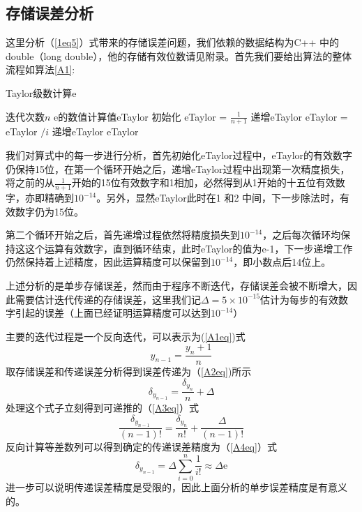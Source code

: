 \documentclass[onecolumn,compsoc]{IEEEtran}
\renewcommand{\|}{\Bigg |}
\newcommand{\e}{\mathrm{e}}
\begin{document}
\subsection{存储误差分析}
这里分析（\ref{1eq5}）式带来的存储误差问题，我们依赖的数据结构为C++ 中的double（long double），他的存储有效位数请见附录。首先我们要给出算法的整体流程如算法\ref{A1}:
\begin{algorithm}[h]\caption{Taylor级数计算e}\label{A1}
\begin{algorithmic}
\Require 迭代次数$n$
\Ensure e的数值计算值eTaylor
\State 初始化 eTaylor = $\frac{1}{n+1}$
\State 递增eTaylor
\State eTaylor = eTaylor $/i$
\EndFor
\State 递增eTaylor
\State \Return eTaylor
\end{algorithmic}\end{algorithm}
我们对算式中的每一步进行分析，首先初始化eTaylor过程中，eTaylor的有效数字仍保持15位，在第一个循环开始之后，递增eTaylor过程中出现第一次精度损失，将之前的从$\frac{1}{n+1}$开始的15位有效数字和1相加，必然得到从1开始的十五位有效数字，亦即精确到$10^{-14}$。另外，显然eTaylor此时在1 和2 中间，下一步除法时，有效数字仍为15位。

第二个循环开始之后，首先递增过程依然将精度损失到$10^{-14}$，之后每次循环均保持这这个运算有效数字，直到循环结束，此时eTaylor的值为e-1，下一步递增工作仍然保持着上述精度，因此运算精度可以保留到$10^{-14}$，即小数点后14位上。

上述分析的是单步存储误差，然而由于程序不断迭代，存储误差会被不断增大，因此需要估计迭代传递的存储误差，这里我们记$\Delta =5\times10^{-15}$估计为每步的有效数字引起的误差（上面已经证明运算精度可以达到$10^{-14}$）

主要的迭代过程是一个反向迭代，可以表示为(\ref{A1eq})式
\begin{equation}\label{A1eq}y_{n-1} = \frac{y_n + 1}{n}\end{equation}
取存储误差和传递误差分析得到误差传递为（\ref{A2eq})所示
\begin{equation}\label{A2eq}\delta_{y_{n-1}} = \frac{\delta_{y_{n}}}{n}+ \Delta\end{equation}
处理这个式子立刻得到可递推的（\ref{A3eq}）式
\begin{equation}\label{A3eq}\frac{\delta_{y_{n-1}}}{(n-1)!} = \frac{\delta_{y_{n}}}{n!}
+ \frac{\Delta}{(n-1)!}\end{equation}
反向计算等差数列可以得到确定的传递误差精度为（\ref{A4eq}）式
\begin{equation}\label{A4eq}\delta_{y_{n-1}} = \Delta\sum_{i=0}^n\frac{1}{i!}\approx{\Delta\e}\end{equation}
进一步可以说明传递误差精度是受限的，因此上面分析的单步误差精度是有意义的。
\end{document}

